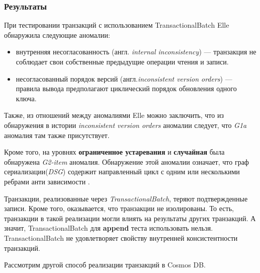 \documentclass[12pt,  openany]{book}
\begin{document}
\subsubsection{Результаты}
\par При тестировании транзакций с использованием TransactionalBatch Elle обнаружила следующие аномалии:
\begin{itemize}
\item внутренняя несогласованность (англ. \textit{internal inconsistency}) --- транзакция не соблюдает свои собственные предыдущие операции чтения и записи.
\item несогласованный порядок версий (англ.\textit{inconsistent version orders}) --- правила вывода предполагают циклический порядок обновления одного ключа.
\end{itemize}
Также, из отношений между аномалиями Elle\cite{Kingsbury2020ElleII} можно заключить, что из обнаружения в истории  \textit{inconsistent version orders} аномалии следует, что \textit{G1a} аномалия там также присутствует.
\par Кроме того, на уровнях \textbf{ограниченное устаревания} и \textbf{случайная} была обнаружена \textit{G2-item} аномалия. Обнаружение этой аномалии означает, что граф сериализации(\textit{DSG}) содержит направленный цикл с одним или несколькими ребрами анти зависимости \cite{IsolationLevelDefinitions}.
\par Транзакции, реализованные через \textit{TransactionalBatch}, теряют подтвержденные записи.  Кроме того, оказывается, что транзакции не изолированы. То есть, транзакции в такой реализации могли влиять на результаты других транзакций.
А значит, TransactionalBatch для \textbf{append} теста использовать нельзя. TransactionalBatch не удовлетворяет свойству внутренней консистентности транзакций.
\par Рассмотрим другой способ реализации транзакций в Cosmos DB. 
\end{document}
